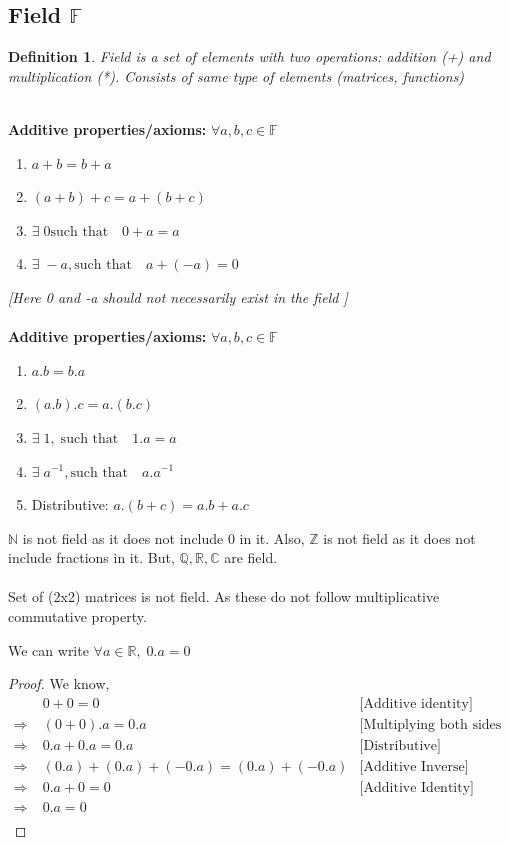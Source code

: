 \documentclass{article}
\newtheorem{definition}{Definition}[section]
\newcommand{\R}{\mathbb{R}}
\newcommand{\Rw}{\Rightarrow}
\newcommand{\hs}{\hspace}
\begin{document}
\subsection{Field {$\mathbb{F}$}}
\begin{definition}
    Field is a set of elements with two operations: addition (+) and multiplication (*). Consists of same type of elements (matrices, functions)\\\\
\end{definition}
\textbf{Additive properties/axioms:} $\forall a,b,c \in \mathbb{F}$
\begin{enumerate}
    \item $ a+b=b+a $
    \item $ (a+b)+c=a+(b+c)$
    \item   $\exists\; 0 \text{such that}\quad 0+a=a$
    \item   $\exists \;-a, \text{such that}\quad a+(-a)=0$
\end{enumerate}
\textit{[Here 0 and -a should not necessarily exist in the field ]}\\\\
\textbf{Additive properties/axioms:} $\forall a,b,c \in \mathbb{F}$
\begin{enumerate}
    \item $a.b=b.a $
    \item $(a.b).c=a.(b.c)  $
    \item $\exists \;1 ,\;\text{such that}\quad 1.a=a $
    \item $\exists \;a^{-1}, \text{such that}\quad a.a^{-1}$ 
    \item Distributive: $a.(b+c)=a.b+a.c$
\end{enumerate}
$\mathbb{N}$ is not field as it does not include  0 in it. 
Also, $\mathbb{Z}$ is not field as it does not include  fractions in it.
But, $\mathbb{Q,R,C}$ are field. \\\\
Set of (2x2) matrices is not field. As these do not follow multiplicative commutative property.
\begin{theorem}{}{}
    We can write $\forall a \in \R,\;0.a=0$
\begin{proof}We know,
    \begin{align*}
              & 0+0 = 0                         & \text{[Additive identity]}             \\
        \Rw\; & (0+0).a  = 0.a                  & \text{[Multiplying both sides with a]} \\
        \Rw\; & 0.a + 0.a=0.a                   & \text{[Distributive]}                  \\
        \Rw\; & (0.a)+(0.a)+(-0.a)=(0.a)+(-0.a) & \text{[Additive Inverse]}              \\
        \Rw\; & 0.a+0=0 \hs{5cm}                & \text{[Additive Identity]}             \\
        \Rw\; & 0.a=0                                                                    \\
    \end{align*}
\end{proof}
\end{theorem}
\end{document}
